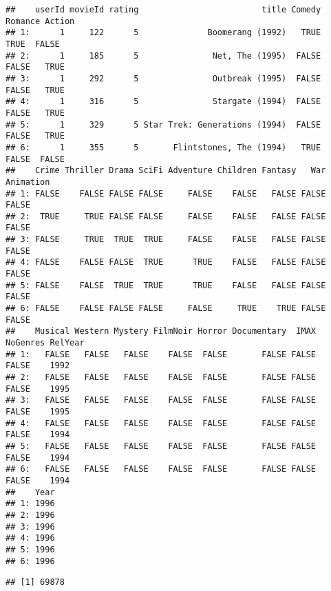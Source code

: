 \documentclass[
]{article}
\newenvironment{Shaded}{\begin{snugshade}}{\end{snugshade}}
\newcommand{\KeywordTok}[1]{\textcolor[rgb]{0.13,0.29,0.53}{\textbf{#1}}}
\newcommand{\NormalTok}[1]{#1}
\newcommand{\OperatorTok}[1]{\textcolor[rgb]{0.81,0.36,0.00}{\textbf{#1}}}
\begin{document}
\begin{verbatim}
##    userId movieId rating                         title Comedy Romance Action
## 1:      1     122      5              Boomerang (1992)   TRUE    TRUE  FALSE
## 2:      1     185      5               Net, The (1995)  FALSE   FALSE   TRUE
## 3:      1     292      5               Outbreak (1995)  FALSE   FALSE   TRUE
## 4:      1     316      5               Stargate (1994)  FALSE   FALSE   TRUE
## 5:      1     329      5 Star Trek: Generations (1994)  FALSE   FALSE   TRUE
## 6:      1     355      5       Flintstones, The (1994)   TRUE   FALSE  FALSE
##    Crime Thriller Drama SciFi Adventure Children Fantasy   War Animation
## 1: FALSE    FALSE FALSE FALSE     FALSE    FALSE   FALSE FALSE     FALSE
## 2:  TRUE     TRUE FALSE FALSE     FALSE    FALSE   FALSE FALSE     FALSE
## 3: FALSE     TRUE  TRUE  TRUE     FALSE    FALSE   FALSE FALSE     FALSE
## 4: FALSE    FALSE FALSE  TRUE      TRUE    FALSE   FALSE FALSE     FALSE
## 5: FALSE    FALSE  TRUE  TRUE      TRUE    FALSE   FALSE FALSE     FALSE
## 6: FALSE    FALSE FALSE FALSE     FALSE     TRUE    TRUE FALSE     FALSE
##    Musical Western Mystery FilmNoir Horror Documentary  IMAX NoGenres RelYear
## 1:   FALSE   FALSE   FALSE    FALSE  FALSE       FALSE FALSE    FALSE    1992
## 2:   FALSE   FALSE   FALSE    FALSE  FALSE       FALSE FALSE    FALSE    1995
## 3:   FALSE   FALSE   FALSE    FALSE  FALSE       FALSE FALSE    FALSE    1995
## 4:   FALSE   FALSE   FALSE    FALSE  FALSE       FALSE FALSE    FALSE    1994
## 5:   FALSE   FALSE   FALSE    FALSE  FALSE       FALSE FALSE    FALSE    1994
## 6:   FALSE   FALSE   FALSE    FALSE  FALSE       FALSE FALSE    FALSE    1994
##    Year
## 1: 1996
## 2: 1996
## 3: 1996
## 4: 1996
## 5: 1996
## 6: 1996
\end{verbatim}

\begin{Shaded}
\end{Shaded}

\begin{verbatim}
## [1] 69878
\end{verbatim}

\begin{Shaded}
\end{Shaded}
\end{document}
